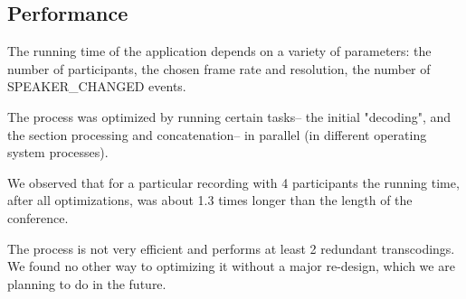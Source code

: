 \documentclass[twoside,openright,a4paper,12pt,english]{article}
\begin{document}
\subsection{Performance}
The running time of the application depends on a variety of parameters: the
number of participants, the chosen frame rate and resolution, the number of
SPEAKER\_CHANGED events.

The process was optimized by running certain tasks-- the initial "decoding",
and the section processing and concatenation-- in parallel (in different
operating system processes). 

We observed that for a particular recording with 4
participants the running time, after all optimizations,
was about 1.3 times longer than the length of the conference. 

The process is not very efficient and performs at least 2 redundant
transcodings. We found no other way to optimizing it without a major re-design,
which we are planning to do in the future.
\end{document}

